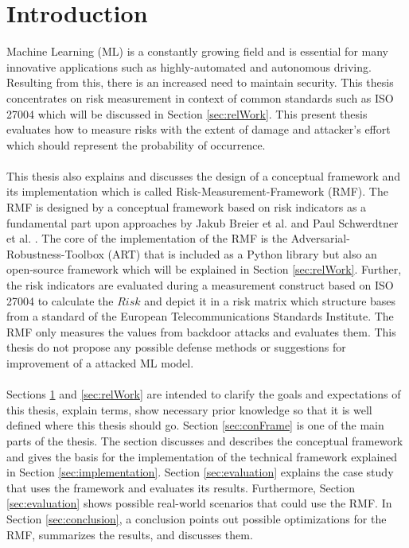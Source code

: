 \section{Introduction}
\label{sec:intro}

Machine Learning (ML) is a constantly growing field and is essential for many innovative applications such as highly-automated and autonomous driving. Resulting from this,
there is an increased need to maintain security. This thesis concentrates on risk measurement in context of common standards such as ISO 27004 which will be
discussed in Section \ref{sec:relWork}. This present thesis evaluates how to measure risks with the extent of damage and attacker's effort which should represent the probability of occurrence. \\ \\

This thesis also explains and discusses the design of a conceptual framework and its implementation which is called Risk-Measurement-Framework (RMF). The RMF is designed by a
conceptual framework based on risk indicators as a fundamental part upon approaches by Jakub Breier et al. \cite{DBLP:journals/corr/abs-2012-04884} and Paul Schwerdtner et al.
\cite{DBLP:journals/corr/abs-2011-04328}. The core of the implementation of the RMF is the Adversarial-Robustness-Toolbox (ART) that is included as a Python library but also an open-source
framework which will be explained in Section \ref{sec:relWork}. Further, the risk indicators are evaluated during a measurement construct based on ISO 27004 to calculate the $Risk$ and depict it in a risk matrix which structure bases from a standard of the European Telecommunications Standards Institute. The RMF only measures the values from backdoor attacks and evaluates them. This thesis do not propose any possible defense methods or suggestions for improvement of a attacked ML model. \\ \\

Sections \ref{sec:intro} and \ref{sec:relWork} are intended to clarify the goals and expectations of this thesis, explain terms, show necessary prior knowledge so that it is well defined where this thesis should go. Section \ref{sec:conFrame} is one of the main parts of the thesis. The section discusses and describes the conceptual framework and gives the basis for the implementation of the technical framework explained in Section \ref{sec:implementation}. Section \ref{sec:evaluation} explains the case study that uses the framework and evaluates its results. Furthermore, Section
\ref{sec:evaluation} shows possible real-world scenarios that could use the RMF. In Section \ref{sec:conclusion}, a conclusion points out possible optimizations for the RMF, summarizes the results, and discusses them.

